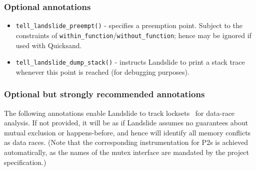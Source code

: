 \subsubsection{Optional annotations}

\begin{itemize}
	\item {\tt tell\_landslide\_preempt()} - specifies a preemption point.
		Subject to the constraints of {\tt within\_function}/{\tt without\_function};
		hence may be ignored if used with Quicksand.
	\item {\tt tell\_landslide\_dump\_stack()} - instructs Landslide to print a stack trace whenever this point is reached (for debugging purposes).
\end{itemize}

\subsubsection{Optional but strongly recommended annotations}

The following annotations enable Landslide to track locksets~\cite{eraser} for data-race analysis.
If not provided, it will be as if Landslide assumes no guarantees about mutual exclusion or happens-before,
and hence will identify all memory conflicts as data races.
(Note that the corresponding instrumentation for P2s is achieved automatically,
as the names of the mutex interface are mandated by the project specification.)

